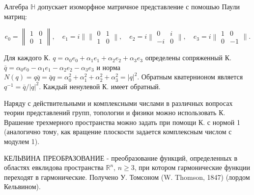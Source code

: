 \documentclass[10pt]{article}
\begin{document}
Алгебра $\mathbb{H}$ допускает изоморфное матричное представление с помошью Паули матриц:



\[

e_{0}=\left\|\begin{array}{ll}

1 & 0 \\

0 & 1

\end{array}\right\|, \quad e_{1}=i\|\| \begin{array}{ll}

0 & 1 \\

1 & 0

\end{array}\left\|, \quad e_{2}=i\right\| \begin{array}{cc}

0 & i \\

-i & 0

\end{array}\left\|, \quad e_{3}=i\right\| \begin{array}{cc}

1 & 0 \\

0 & -1

\end{array} \| .

\]



Для каждого К. $q=\alpha_{0} e_{0}+\alpha_{1} e_{1}+\alpha_{2} e_{2}+\alpha_{3} e_{3}$ определены сопряженный К. $\bar{q}=\alpha_{0} e_{0}-\alpha_{1} e_{1}-\alpha_{2} e_{2}-\alpha_{3} e_{3}$ и норма $N(q)=q \bar{q}=\bar{q} q=\alpha_{0}^{2}+\alpha_{1}^{2}+\alpha_{2}^{2}+\alpha_{3}^{2}=|q|^{2}$. Обратным кватернионом является $q^{-1}=\bar{q} /|q|^{2}$. Каждый ненулевой К. имеет обратный.



Наряду с действительными и комплексными числами в различных вопросах теории представлений групп, топологии и физики можно использовать К. Врашение трехмерного пространства можно задать при помощи К. с нормой 1 (аналогично тому, как вращение плоскости задается комплексным числом с модулем 1).



КЕЛЬВИНА ПРЕОБРАЗОВАНИЕ - преобразование функций, определенных в областях евклидова пространства $\mathbb{R}^{n}$, $n \geqslant 3$, при котором гармонические функции переходят в гармонические. Получено У. Томсоном (W. Thomson, 1847) (лордом Кельвином).
\end{document}
